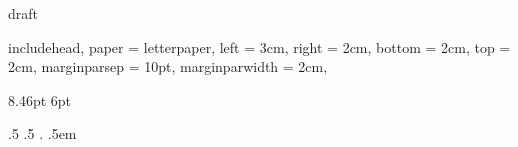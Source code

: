 \ExplSyntaxOn
\makeatletter

{
    \RequirePackage { geometry }
    \RequirePackage { setspace }
    \RequirePackage { epigraph }
    \RequirePackage { lineno }
     { draft } {}
        { \RequirePackage [ tracking=smallcaps, babel=true, ] { microtype } }
    \RequirePackage [final, colorlinks, allcolors=black] { hyperref }
}{}
\RequirePackage [ spanish ] { babel }
\RequirePackage { enumitem }
\RequirePackage { biblatex }
\RequirePackage { graphicx }
\RequirePackage { amsthm, mathtools }

{
    \geometry
    {
        includehead,
        paper = letterpaper,
        left = 3cm,
        right = 2cm,
        bottom = 2cm,
        top = 2cm,
        marginparsep = 10pt,
        marginparwidth = 2cm,
    }
}{}


\usepackage{fontspec}
\usepackage[bold-style=ISO]{unicode-math}
{
    \setmainfont{STIX Two Text}
}
{
    \setmainfont{STIX Two Text}
}
\newcommand{\titlefont}{\bfseries}

{
    \setlength { \parindent } { 8.46pt }
    \setlength { \parskip } { 6pt }
    \onehalfspacing
}{}



    {.5\baselineskip}%
    {.5\baselineskip}%
    {}%
    {}%
    {\scshape}%
    {.}%
    {.5em}%
    {}%
\theoremstyle{teo}
    {}
    {}
\newtheorem{defi}[equation]{Definición}
\newtheorem{lem}[equation]{Lema}
\newtheorem{teo}[equation]{Teorema}
\newtheorem{cor}[equation]{Corolario}
\newtheorem{ques}[equation]{Pregunta}

\renewcommand\qedsymbol{\textsc{q.e.d.}}

